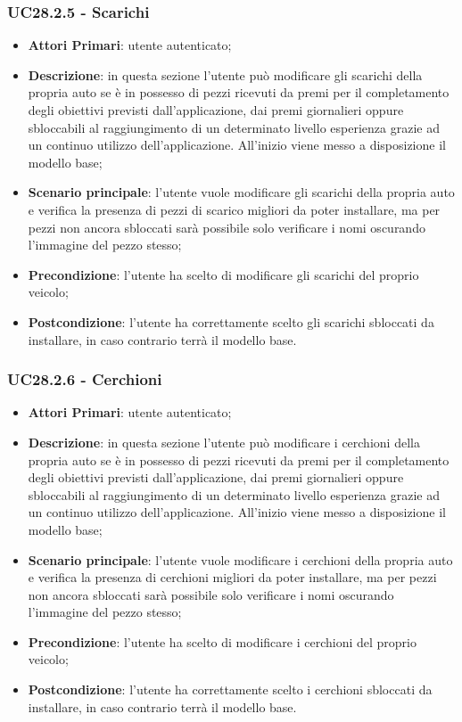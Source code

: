 \subsubsection{UC28.2.5 - Scarichi}
\begin{itemize}
	\item \textbf{Attori Primari}: utente autenticato;
	\item \textbf{Descrizione}: in questa sezione l'utente può modificare gli scarichi della propria auto se è in possesso di pezzi ricevuti da premi per il completamento degli obiettivi previsti dall'applicazione, dai premi giornalieri oppure sbloccabili al raggiungimento di un determinato livello esperienza grazie ad un continuo utilizzo dell'applicazione.
	All'inizio viene messo a disposizione il modello base;
	\item \textbf{Scenario principale}: l'utente vuole modificare gli scarichi della propria auto e verifica la presenza di pezzi di scarico migliori da poter installare, ma per pezzi non ancora sbloccati sarà possibile solo verificare i nomi oscurando l'immagine del pezzo stesso;
	\item \textbf{Precondizione}: l'utente ha scelto di modificare gli scarichi del proprio veicolo; 
	\item \textbf{Postcondizione}: l'utente ha correttamente scelto gli scarichi sbloccati da installare, in caso contrario terrà il modello base.
\end{itemize}
\subsubsection{UC28.2.6 - Cerchioni}
\begin{itemize}
	\item \textbf{Attori Primari}: utente autenticato;
	\item \textbf{Descrizione}: in questa sezione l'utente può modificare i cerchioni della propria auto se è in possesso di pezzi ricevuti da premi per il completamento degli obiettivi previsti dall'applicazione, dai premi giornalieri oppure sbloccabili al raggiungimento di un determinato livello esperienza grazie ad un continuo utilizzo dell'applicazione.
	All'inizio viene messo a disposizione il modello base;
	\item \textbf{Scenario principale}: l'utente vuole modificare i cerchioni della propria auto e verifica la presenza di cerchioni migliori da poter installare, ma per pezzi non ancora sbloccati sarà possibile solo verificare i nomi oscurando l'immagine del pezzo stesso;
	\item \textbf{Precondizione}: l'utente ha scelto di modificare i cerchioni del proprio veicolo; 
	\item \textbf{Postcondizione}: l'utente ha correttamente scelto i cerchioni sbloccati da installare, in caso contrario terrà il modello base.
\end{itemize} 
